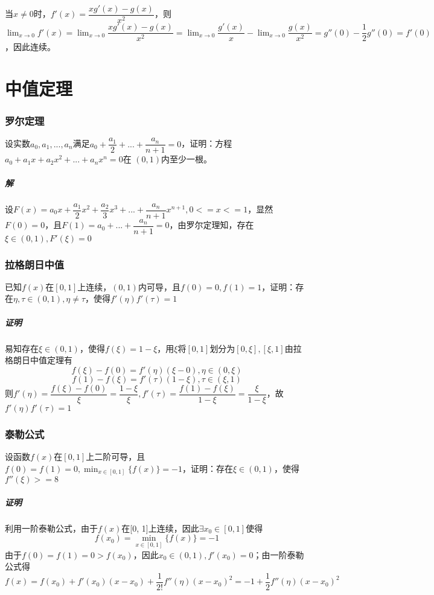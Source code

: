 当\(x \neq 0\)时，\(f'(x) = \dfrac{xg'(x) - g(x)}{x^2}\)，则\(\displaystyle\lim_{x \to 0}f'(x) = \lim_{x \to 0}\dfrac{xg'(x) - g(x)}{x^2} = \lim_{x \to 0}\dfrac{g'(x)}{x} - \lim_{x \to 0}\dfrac{g(x)}{x^2} = g''(0) - \dfrac{1}{2}g''(0) = f'(0)\)，因此连续。


\section{中值定理}

\subsubsection{罗尔定理}
设实数\(a_0, a_1, ..., a_n\)满足\(a_0 + \dfrac{a_1}{2} + ... + \dfrac{a_n}{n + 1} = 0\)，证明：方程\(a_0 + a_1x + a_2x^2 + ... + a_nx^n = 0\)在 \((0, 1)\)内至少一根。

\subparagraph{解}
设\(F(x) = a_0x + \dfrac{a_1}{2}x^2 + \dfrac{a_2}{3}x^3 + ... + \dfrac{a_n}{n + 1}x^{n + 1}, 0 <= x <= 1\)，显然\(F(0) = 0\)，且\(F(1) = a_0 + ... + \dfrac{a_n}{n + 1} = 0\)，由罗尔定理知，存在\(\xi \in (0, 1), F'(\xi) = 0\)


\subsubsection{拉格朗日中值}
已知\(f(x)\)在\([0, 1]\)上连续，\((0, 1)\)内可导，且\(f(0) = 0, f(1) = 1\)，证明：存在\(\eta, \tau \in (0, 1), \eta \neq \tau\)，使得\(f'(\eta)f'(\tau) = 1\)

\subparagraph{证明}
易知存在\(\xi \in (0, 1)\)，使得\(f(\xi) = 1 - \xi\)，用\(\xi\)将\([0, 1]\)划分为\([0, \xi], [\xi, 1]\)由拉格朗日中值定理有\[f(\xi) - f(0) = f'(\eta)(\xi - 0), \eta \in (0, \xi)\]
\[f(1) - f(\xi) = f'(\tau)(1 - \xi), \tau \in (\xi, 1)\]
则\(f'(\eta) = \dfrac{f(\xi) - f(0)}{\xi} = \dfrac{1 - \xi}{\xi}, f'(\tau) = \dfrac{f(1) - f(\xi)}{1 - \xi} = \dfrac{\xi}{1 - \xi}\)，故\(f'(\eta)f'(\tau) = 1\)


\subsubsection{泰勒公式}
设函数\(f(x)\)在\([0, 1]\)上二阶可导，且\(f(0) = f(1) = 0, \displaystyle \min_{x \in [0, 1]}\{f(x)\} = -1\)，证明：存在\(\xi \in (0, 1)\)，使得\(f''(\xi) >= 8\)

\subparagraph{证明}
利用一阶泰勒公式，由于\(f(x)\)在[0, 1]上连续，因此\(\exists x_0 \in [0, 1]\)使得\[f(x_0) = \displaystyle\min_{x \in [0, 1]}\{f(x)\} = -1\]
由于\(f(0) = f(1) = 0 > f(x_0)\)，因此\(x_0 \in (0, 1), f'(x_0) = 0\)；由一阶泰勒公式得\[f(x) = f(x_0) + f'(x_0)(x - x_0) + \dfrac{1}{2!}f''(\eta)(x - x_0)^2 = -1 + \dfrac{1}{2}f''(\eta)(x - x_0)^2\]

